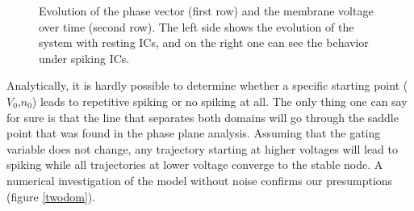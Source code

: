 \documentclass[12pt,a4paper]{article}
\begin{document}
\begin{figure}[H]
	\caption{Evolution of the phase vector (first row) and the membrane voltage over time (second row).
		The left side shows the evolution of the system with resting ICs, and on the right one can see the behavior under spiking ICs.}
	\label{subfig} 
\end{figure}
Analytically, it is hardly possible to determine whether a specific starting point ($V_0$,$n_0$) leads to repetitive spiking or no spiking at all. The only thing one can say for sure is that the line that separates both domains will go through the saddle point that was found in the phase plane analysis. Assuming that the gating variable does not change, any trajectory starting at higher voltages will lead to spiking while all trajectories at lower voltage converge to the stable node. A numerical investigation of the model without noise confirms our presumptions (figure \ref{twodom}).
\end{document}
